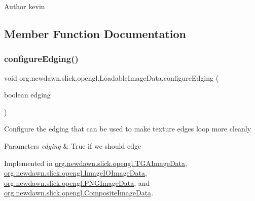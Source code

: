 \begin{DoxyAuthor}{Author}
kevin 
\end{DoxyAuthor}


\subsection{Member Function Documentation}
\mbox{\label{interfaceorg_1_1newdawn_1_1slick_1_1opengl_1_1_loadable_image_data_a1f9fb94bae3936761535408ba7afc0df}} 
\subsubsection{\texorpdfstring{configure\+Edging()}{configureEdging()}}
{\footnotesize\ttfamily void org.\+newdawn.\+slick.\+opengl.\+Loadable\+Image\+Data.\+configure\+Edging (\begin{DoxyParamCaption}\item[{boolean}]{edging }\end{DoxyParamCaption})}

Configure the edging that can be used to make texture edges loop more cleanly


\begin{DoxyParams}{Parameters}
{\em edging} & True if we should edge \\
\hline
\end{DoxyParams}


Implemented in \mbox{\hyperlink{classorg_1_1newdawn_1_1slick_1_1opengl_1_1_t_g_a_image_data_a05f274a1f466b4a58192c99d1c500535}{org.\+newdawn.\+slick.\+opengl.\+T\+G\+A\+Image\+Data}}, \mbox{\hyperlink{classorg_1_1newdawn_1_1slick_1_1opengl_1_1_image_i_o_image_data_a6329973823fe6d99e2238530bac60a60}{org.\+newdawn.\+slick.\+opengl.\+Image\+I\+O\+Image\+Data}}, \mbox{\hyperlink{classorg_1_1newdawn_1_1slick_1_1opengl_1_1_p_n_g_image_data_a9083d1ca4c73f7d648eaa73d477d4d63}{org.\+newdawn.\+slick.\+opengl.\+P\+N\+G\+Image\+Data}}, and \mbox{\hyperlink{classorg_1_1newdawn_1_1slick_1_1opengl_1_1_composite_image_data_a9f2859d594b5040ea7ab930f194412ac}{org.\+newdawn.\+slick.\+opengl.\+Composite\+Image\+Data}}.


